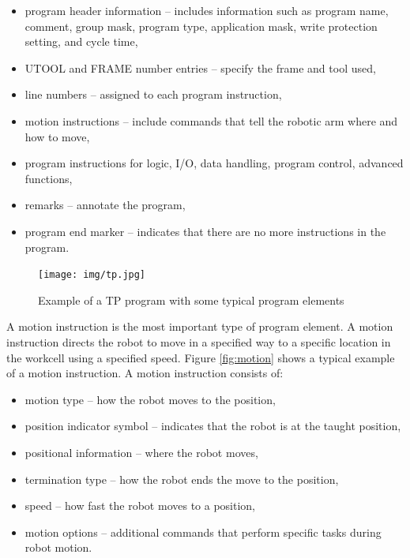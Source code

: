 \begin{itemize}

\item program header information -- includes information such as program name, comment, group mask, program type, application mask, write protection setting, and cycle time, 
\item UTOOL and FRAME number entries -- specify the frame and tool used,
\item line numbers -- assigned to each program instruction,
\item motion instructions -- include commands that tell the robotic arm where and how to move,
\item program instructions for logic, I/O, data handling, program control, advanced functions,
\item remarks -- annotate the program,
\item program end marker -- indicates that there are no more instructions in the program.

\end{itemize}

\begin{figure}[h]
    \centering
    \texttt{[image: img/tp.jpg]}
    \caption[Example of a TP program with some typical program elements]{Example of a TP program with some typical program elements \protect\cite{fanuchandling} }
    \label{fig:tp}
\end{figure}

A motion instruction is the most important type of program element. A motion instruction directs the robot to move in a specified way to a specific location in the workcell using a specified speed. Figure \ref{fig:motion} shows a typical example of a motion instruction. A motion instruction consists of:

\begin{itemize}

\item motion type -- how the robot moves to the position,
\item position indicator symbol -- indicates that the robot is at the taught position,
\item positional information -- where the robot moves,
\item termination type -- how the robot ends the move to the position,
\item speed -- how fast the robot moves to a position,
\item motion options -- additional commands that perform specific tasks during robot motion.

\end{itemize}

